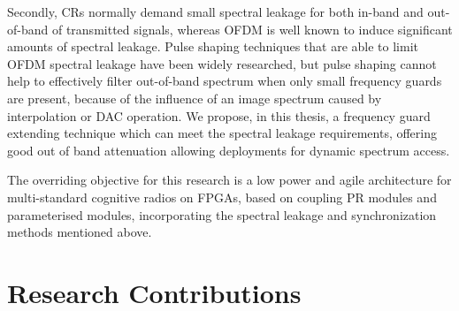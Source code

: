 Secondly, CRs normally demand small spectral leakage for both in-band and out-of-band of transmitted signals, whereas OFDM is well known to induce significant amounts of spectral leakage.
Pulse shaping techniques that are able to limit OFDM spectral leakage have been widely researched, but pulse shaping cannot help to effectively filter out-of-band spectrum when only small frequency guards are present, because of the influence of an image spectrum caused by interpolation or DAC operation.
We propose, in this thesis, a frequency guard extending technique which can meet the spectral leakage requirements, offering good out of band attenuation allowing deployments for dynamic spectrum access.

The overriding objective for this research is a low power and agile architecture for multi-standard cognitive radios on FPGAs, based on coupling PR modules and parameterised modules, incorporating the spectral leakage and synchronization methods mentioned above.

\section{Research Contributions}

